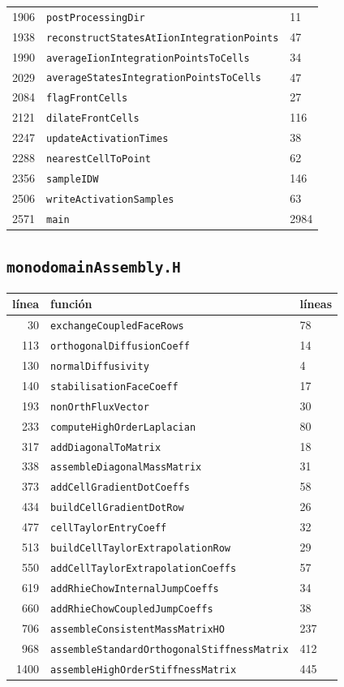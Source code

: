 \documentclass[11pt,a4paper]{article}
\begin{document}
\begin{longtable}{rll}
1906 & \texttt{postProcessingDir} & 11 \\
1938 & \texttt{reconstructStatesAtIionIntegrationPoints} & 47 \\
1990 & \texttt{averageIionIntegrationPointsToCells} & 34 \\
2029 & \texttt{averageStatesIntegrationPointsToCells} & 47 \\
2084 & \texttt{flagFrontCells} & 27 \\
2121 & \texttt{dilateFrontCells} & 116 \\
2247 & \texttt{updateActivationTimes} & 38 \\
2288 & \texttt{nearestCellToPoint} & 62 \\
2356 & \texttt{sampleIDW} & 146 \\
2506 & \texttt{writeActivationSamples} & 63 \\
2571 & \texttt{main} & 2984 \\
\bottomrule
\end{longtable}
\subsection*{\texttt{monodomainAssembly.H}}
\begin{longtable}{rll}
\toprule
línea & función & líneas \\
\midrule
\endhead
30 & \texttt{exchangeCoupledFaceRows} & 78 \\
113 & \texttt{orthogonalDiffusionCoeff} & 14 \\
130 & \texttt{normalDiffusivity} & 4 \\
140 & \texttt{stabilisationFaceCoeff} & 17 \\
193 & \texttt{nonOrthFluxVector} & 30 \\
233 & \texttt{computeHighOrderLaplacian} & 80 \\
317 & \texttt{addDiagonalToMatrix} & 18 \\
338 & \texttt{assembleDiagonalMassMatrix} & 31 \\
373 & \texttt{addCellGradientDotCoeffs} & 58 \\
434 & \texttt{buildCellGradientDotRow} & 26 \\
477 & \texttt{cellTaylorEntryCoeff} & 32 \\
513 & \texttt{buildCellTaylorExtrapolationRow} & 29 \\
550 & \texttt{addCellTaylorExtrapolationCoeffs} & 57 \\
619 & \texttt{addRhieChowInternalJumpCoeffs} & 34 \\
660 & \texttt{addRhieChowCoupledJumpCoeffs} & 38 \\
706 & \texttt{assembleConsistentMassMatrixHO} & 237 \\
968 & \texttt{assembleStandardOrthogonalStiffnessMatrix} & 412 \\
1400 & \texttt{assembleHighOrderStiffnessMatrix} & 445 \\
\bottomrule
\end{longtable}
\end{document}
